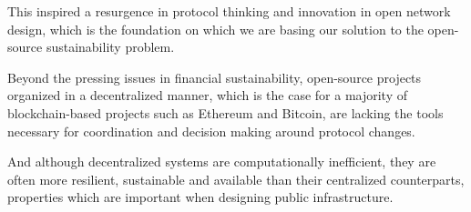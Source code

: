 This inspired a resurgence in protocol thinking and innovation in open network
design, which is the foundation on which we are basing our solution to the
open-source sustainability problem.

Beyond the pressing issues in financial sustainability, open-source projects
organized in a decentralized manner, which is the case for a majority of
blockchain-based projects such as Ethereum and Bitcoin, are lacking the tools
necessary for coordination and decision making around protocol changes.

And although decentralized systems are computationally inefficient, they are
often more resilient, sustainable and available than their centralized
counterparts, properties which are important when designing public
infrastructure.

\pagebreak
